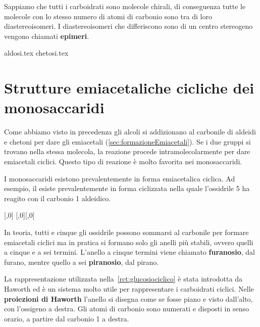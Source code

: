 Sappiamo che tutti i carboidrati sono molecole chirali, di conseguenza tutte le molecole con lo stesso numero di atomi di carbonio sono tra di loro diastereoisomeri. I diastereoisomeri che differiscono sono di un centro stereogeno vengono chiamati \textbf{epimeri}.

{aldosi.tex}
{chetosi.tex}

\section{Strutture emiacetaliche cicliche dei monosaccaridi}
Come abbiamo visto in precedenza gli alcoli si addizionano al carbonile di aldeidi e chetoni per dare gli emiacetali (\autoref{sec:formazioneEmiacetali}). Se i due gruppi si trovano nella stessa molecola, la reazione procede intramolecolarmente per dare emiacetali ciclici. Questo tipo di reazione è molto favorita nei monosaccaridi.

I monosaccaridi esistono prevalentemente in forma emiacetalica ciclica. Ad esempio, il  esiste prevalentemente in forma ciclizzata nella quale l'ossidrile 5 ha reagito con il carbonio 1 aldeidico.
\begin{reaction}\label{rct:glucosiociclico}
	[,0]
	\arrow
	\chemnameinit{}
	[,0]\+[,0]
\end{reaction}
\chemnameinit{}
In teoria, tutti e cinque gli ossidrile possono sommarsi al carbonile per formare emiacetali ciclici ma in pratica si formano solo gli anelli più stabili, ovvero quelli a cinque e a sei termini. L'anello a cinque termini viene chiamato \textbf{furanosio}, dal furano, mentre quello a sei \textbf{piranosio}, dal pirano.

La rappresentazione utilizzata nella~\autoref{rct:glucosiociclico} è stata introdotta da Haworth ed è un sistema molto utile per rappresentare i carboidrati ciclici. Nelle \textbf{proiezioni di Haworth} l'anello si disegna come se fosse piano e visto dall'alto, con l'ossigeno a destra. Gli atomi di carbonio sono numerati e disposti in senso orario, a partire dal carbonio 1 a destra.

